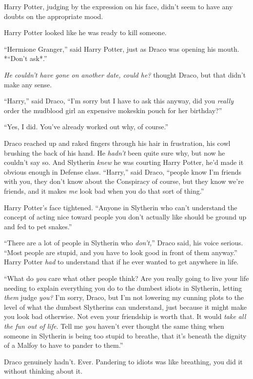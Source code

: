 Harry Potter, judging by the expression on his face, didn't seem to have
any doubts on the appropriate mood.

Harry Potter looked like he was ready to kill someone.

``Hermione Granger,'' said Harry Potter, just as Draco was opening his
mouth. *``Don't ask*.''

\emph{He couldn't have gone on another date, could he?} thought Draco,
but that didn't make any sense.

``Harry,'' said Draco, ``I'm sorry but I have to ask this anyway, did
you \emph{really} order the mudblood girl an expensive mokeskin pouch
for her birthday?''

``Yes, I did. You've already worked out why, of course.''

Draco reached up and raked fingers through his hair in frustration, his
cowl brushing the back of his hand. He \emph{hadn't} been quite sure
why, but now he couldn't say so. And Slytherin \emph{knew} he was
courting Harry Potter, he'd made it obvious enough in Defense class.
``Harry,'' said Draco, ``people know I'm friends with you, they don't
know about the Conspiracy of course, but they know we're friends, and it
makes \emph{me} look bad when you do that sort of thing.''

Harry Potter's face tightened. ``Anyone in Slytherin who can't
understand the concept of acting nice toward people you don't actually
like should be ground up and fed to pet snakes.''

``There are a lot of people in Slytherin who \emph{don't,}'' Draco said,
his voice serious. ``Most people are stupid, and you have to look good
in front of them anyway.'' Harry Potter \emph{had} to understand that if
he ever wanted to get anywhere in life.

``What do \emph{you} care what other people think? Are you really going
to live your life needing to explain everything you do to the dumbest
idiots in Slytherin, letting \emph{them} judge \emph{you?} I'm sorry,
Draco, but I'm not lowering my cunning plots to the level of what the
dumbest Slytherins can understand, just because it might make you look
bad otherwise. Not even your friendship is worth that. It would
\emph{take all the fun out of life.} Tell me \emph{you} haven't ever
thought the same thing when someone in Slytherin is being too stupid to
breathe, that it's beneath the dignity of a Malfoy to have to pander to
them.''

Draco genuinely hadn't. Ever. Pandering to idiots was like breathing,
you did it without thinking about it.

